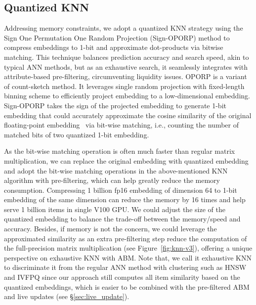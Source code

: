 \subsection{Quantized KNN}\label{sec:quant_knn}


Addressing memory constraints, we adopt a quantized KNN strategy using the Sign One Permutation One Random Projection (Sign-OPORP) method to compress embeddings to 1-bit and approximate dot-products via bitwise matching. This technique balances prediction accuracy and search speed, akin to typical ANN methods, but as an exhaustive search, it seamlessly integrates with attribute-based pre-filtering, circumventing liquidity issues.
OPORP is a variant of count-sketch method. It leverages single random projection with fixed-length binning scheme to efficiently project embedding to a low-dimensional embedding. Sign-OPORP takes the sign of the projected embedding to generate 1-bit embedding that could accurately approximate the cosine similarity of the original floating-point embedding~\cite{li2023oporp} via bit-wise matching, i.e., counting the number of matched bits of two quantized 1-bit embedding.

As the bit-wise matching operation is often much faster than regular matrix multiplication, we can replace the original embedding with quantized embedding and adopt the bit-wise matching operations in the above-mentioned KNN algorithm with pre-filtering, which can help greatly reduce the memory consumption. Compressing 1 billion fp16 embedding of dimension 64 to 1-bit embedding of the same dimension can reduce the memory by 16 times and help serve 1 billion items in single V100 GPU. We could adjust the size of the quantized embedding to balance the trade-off between the memory/speed and accuracy. Besides, if memory is not the concern, we could leverage the approximated similarity as an extra pre-filtering step reduce the computation of the full-precision matrix multiplication (see Figure~\ref{fig:knn-v3}), offering a unique perspective on exhaustive KNN with ABM. Note that, we call it exhaustive KNN to discriminate it from the regular ANN method with clustering such as HNSW and IVFPQ since our approach still computes all item similarity based on the quantized embeddings, which is easier to be combined with the pre-filtered ABM and live updates (see \S\ref{sec:live_update}).


